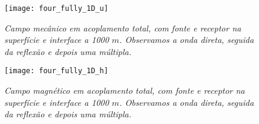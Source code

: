\begin{figure}
\centering
\texttt{[image: four\_fully\_1D\_u]}\\
\caption{\textit{Campo mec\^anico em acoplamento total, com fonte e receptor na superf\'icie e interface a 1000 $m$. Observamos a onda direta, seguida da reflex\~ao e depois uma m\'ultipla.}}
\label{fig.four_fully_1D_u}
\end{figure}


\begin{figure}
\centering
\texttt{[image: four\_fully\_1D\_h]}\\
\caption{\textit{Campo magn\'etico em acoplamento total, com fonte e receptor na superf\'icie e interface a 1000 $m$. Observamos a onda direta, seguida da reflex\~ao e depois uma m\'ultipla.}}
\label{fig.four_fully_1D_h}
\end{figure}


